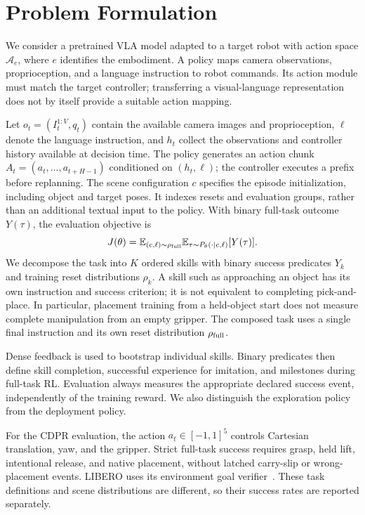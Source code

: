 \section{Problem Formulation}\label{sec:problem}
We consider a pretrained VLA model adapted to a target robot with action space $\mathcal A_e$, where $e$ identifies the embodiment. A policy maps camera observations, proprioception, and a language instruction to robot commands. Its action module must match the target controller; transferring a visual-language representation does not by itself provide a suitable action mapping.

Let $o_t=(I_t^{1:V},q_t)$ contain the available camera images and proprioception, $\ell$ denote the language instruction, and $h_t$ collect the observations and controller history available at decision time. The policy generates an action chunk $A_t=(a_t,\ldots,a_{t+H-1})$ conditioned on $(h_t,\ell)$; the controller executes a prefix before replanning. The scene configuration $c$ specifies the episode initialization, including object and target poses. It indexes resets and evaluation groups, rather than an additional textual input to the policy. With binary full-task outcome $Y(\tau)$, the evaluation objective is
\begin{equation}
J(\theta)=\mathbb{E}_{(c,\ell)\sim\rho_{\rm full}}
\mathbb{E}_{\tau\sim P_\theta(\cdot\mid c,\ell)}[Y(\tau)].
\end{equation}
We decompose the task into $K$ ordered skills with binary success predicates $Y_k$ and training reset distributions $\rho_k$. A skill such as approaching an object has its own instruction and success criterion; it is not equivalent to completing pick-and-place. In particular, placement training from a held-object start does not measure complete manipulation from an empty gripper. The composed task uses a single final instruction and its own reset distribution $\rho_{\rm full}$.

Dense feedback is used to bootstrap individual skills. Binary predicates then define skill completion, successful experience for imitation, and milestones during full-task RL. Evaluation always measures the appropriate declared success event, independently of the training reward. We also distinguish the exploration policy from the deployment policy.

For the CDPR evaluation, the action $a_t\in[-1,1]^5$ controls Cartesian translation, yaw, and the gripper. Strict full-task success requires grasp, held lift, intentional release, and native placement, without latched carry-slip or wrong-placement events. LIBERO uses its environment goal verifier~\cite{libero}. These task definitions and scene distributions are different, so their success rates are reported separately.
